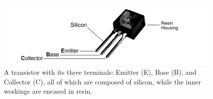 \begin{figure}[ht!]
    \centering
    \includegraphics[width=1\textwidth]{Sections/circuits/transistor.png}

    \vspace{1em}
    \caption{A transistor with its three terminals: Emitter (E), Base (B), and Collector (C), all of which are 
    composed of silicon, while the inner workings are encased in resin.}
    \label{fig:transistor}
\end{figure}